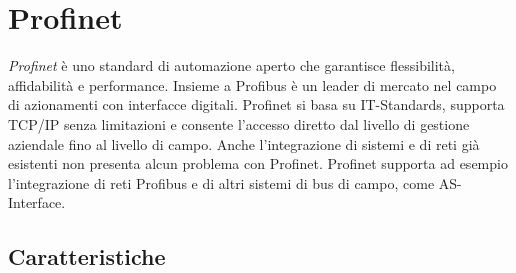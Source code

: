 \documentclass[12pt, a4paper, oneside]{book}
\begin{document}
\section{Profinet}
\textit{Profinet} \cite{profinet} è uno standard di automazione aperto che garantisce flessibilità, affidabilità
e performance.
Insieme a Profibus è un leader di mercato nel campo di azionamenti con interfacce digitali. Profinet si basa su IT-Standards, supporta TCP/IP senza limitazioni e consente l’accesso diretto dal livello di gestione aziendale fino al livello di campo. Anche l’integrazione di sistemi e di reti già esistenti non presenta alcun problema con Profinet. Profinet supporta ad esempio l’integrazione di reti Profibus e di altri sistemi di bus di campo, come AS-Interface.  
\subsection{Caratteristiche}
\end{document}
